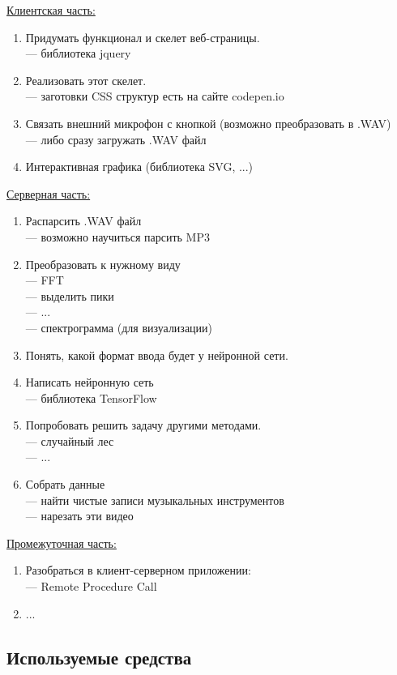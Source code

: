 \documentclass[14pt,a4paper]{article}
\begin{document}
\underline{Клиентская часть:}
\begin{enumerate}
\item Придумать функционал и скелет веб-страницы. \\
\qquad --- библиотека jquery
\item Реализовать этот скелет. \\
\qquad --- заготовки CSS структур есть на сайте codepen.io
\item Связать внешний микрофон с кнопкой (возможно преобразовать в .WAV) \\
\qquad --- либо сразу загружать .WAV файл
\item Интерактивная графика (библиотека SVG, ...)
\end{enumerate}
\vskip 0.7cm
\noindent \underline{Серверная часть:}
\begin{enumerate}
\item Распарсить .WAV файл  \\
\qquad --- возможно научиться парсить MP3
\item Преобразовать к нужному виду \\
\qquad --- FFT \\
\qquad --- выделить пики \\
\qquad --- ... \\
\qquad --- спектрограмма (для визуализации)
\item Понять, какой формат ввода будет у нейронной сети. 
\item Написать нейронную сеть \\
\qquad --- библиотека TensorFlow 
\item Попробовать решить задачу другими методами. \\
\qquad --- случайный лес \\
\qquad --- ...
\item Собрать данные \\
\qquad --- найти чистые записи музыкальных инструментов \\
\qquad --- нарезать эти видео
\end{enumerate}
\vskip 0.7cm
\noindent \underline{Промежуточная часть:}
\begin{enumerate}
\item Разобраться в клиент-серверном приложении: \\
\qquad --- Remote Procedure Call
\item ...
\end{enumerate}
\subsection{Используемые средства}
\end{document}
